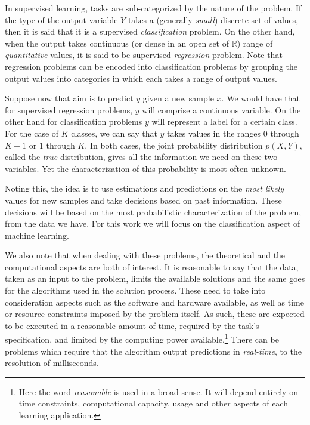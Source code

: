 In supervised learning, tasks are sub-categorized by the nature of the problem.
If the type of the output variable $Y$ takes a (generally \textit{small}) discrete set of values, then it is said that it is a supervised \textit{classification} problem.
On the other hand, when the output takes continuous (or dense in an open set of $\mathbb{R}$) range of \textit{quantitative} values, it is said to be supervised \textit{regression} problem.
Note that regression problems can be encoded into classification problems by grouping the output values into categories in which each takes a range of output values.

Suppose now that  aim is to predict $y$ given a new sample $x$.
We would have that for supervised regression problems, $y$ will comprise a continuous variable.
On the other hand for classification problems $y$ will represent a label for a certain class.
For the case of $K$ classes, we can say that $y$ takes values in the ranges $0$ through $K-1$ or $1$ through $K$.
In both cases, the joint probability distribution $p(X, Y)$, called the \textit{true} distribution, gives all the information we need on these two variables.
Yet the characterization of this probability is most often unknown.

Noting this, the idea is to use estimations and predictions on the \textit{most likely} values for new samples and take decisions based on past information.
These decisions will be based on the most probabilistic characterization of the problem, from the data we have.
For this work we will focus on the classification aspect of machine learning.

We also note that when dealing with these problems, the theoretical and the computational aspects are both of interest.
It is reasonable to say that the data, taken as an input to the problem, limits the available solutions and the same goes for the algorithms used in the solution process.
These need to take into consideration aspects such as the software and hardware available, as well as time or resource constraints imposed by the problem itself.
As such, these are expected to be executed in a reasonable amount of time, required by the task's specification, and limited by the computing power available.\footnote{Here the word \textit{reasonable} is used in a broad sense.
It will depend entirely on time constraints, computational capacity, usage and other aspects of each learning application.} There can be problems which require that the algorithm output predictions in \textit{real-time}, to the resolution of milliseconds.

